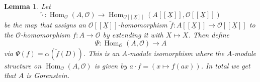 \documentclass{article}
\theoremstyle{plain}%
\newtheorem{lemma}{Lemma}[section]
\theoremstyle{definition}
\theoremstyle{remark}
\renewcommand{\hom}{\operatorname{Hom}}
\begin{document}
\begin{lemma}
    Let 
    \[
        \!\tilde{\cdot}\colon \hom_\mathcal{O}(A, \mathcal{O}) \to 
        \hom_{\mathcal{O}[[\underline{X}]]}(A[[\underline{X}]], \mathcal{O}[[\underline{X}]])
    \]
    be the map that assigns an \(\mathcal{O}[[\underline{X}]]\)-homomorphism
    \(\tilde f\colon A[[\underline{X}]] \to \mathcal{O}[[\underline{X}]]\) to the \(\mathcal{O}\)-homomorphism
    \(f \colon A \to \mathcal{O}\) by extending it with \(X \mapsto X\).
    Then define
    \[
        \Psi \colon \hom_\mathcal{O}(A, \mathcal{O}) \to A  
    \]
    via \(\Psi(f) = \alpha(\tilde{f}(D))\).
    This is an \(A\)-module isomorphism where the \(A\)-module structure on \(\hom_\mathcal{O}(A, \mathcal{O})\)
    is given by \(a \cdot f = (x \mapsto f(ax))\).
    In total we get that \(A\) is Gorenstein.
\end{lemma}
\end{document}
